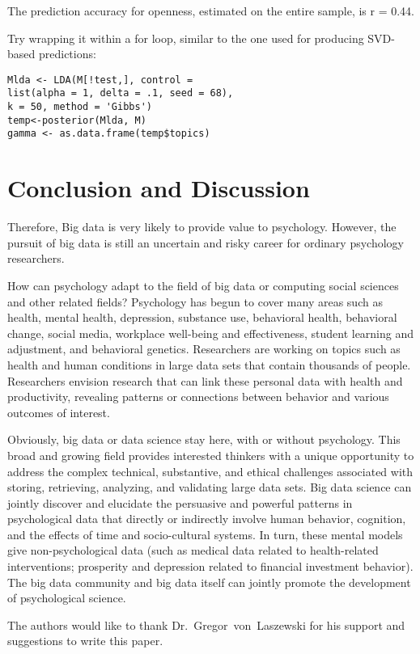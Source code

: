 The prediction accuracy for openness, estimated on the entire
sample, is r = 0.44.

Try wrapping it within a for loop, similar to the one used for 
producing SVD-based predictions:

\begin{verbatim}
Mlda <- LDA(M[!test,], control =
list(alpha = 1, delta = .1, seed = 68),
k = 50, method = 'Gibbs')
temp<-posterior(Mlda, M)
gamma <- as.data.frame(temp$topics)
\end{verbatim}

\section{Conclusion and Discussion}

Therefore, Big data is very likely to provide value to psychology.
 However, the pursuit of big data is still an uncertain and risky 
career for ordinary psychology researchers.

How can psychology adapt to the field of big data or computing 
social sciences and other related fields? Psychology has begun to 
cover many areas such as health, mental health, depression, 
substance use, behavioral health, behavioral change, social media,
 workplace well-being and effectiveness, student learning and 
adjustment, and behavioral genetics. Researchers are working on 
topics such as health and human conditions in large data sets that
 contain thousands of people. Researchers envision research that 
can link these personal data with health and productivity, 
revealing patterns or connections between behavior and various 
outcomes of interest.

Obviously, big data or data science stay here, with or without 
psychology. This broad and growing field provides interested 
thinkers with a unique opportunity to address the complex 
technical, substantive, and ethical challenges associated with 
storing, retrieving, analyzing, and validating large data sets. 
Big data science can jointly discover and elucidate the persuasive
 and powerful patterns in psychological data that directly or 
indirectly involve human behavior, cognition, and the effects of 
time and socio-cultural systems. In turn, these mental models give
 non-psychological data (such as medical data related to 
health-related interventions; prosperity and depression related to
 financial investment behavior). The big data community and big 
data itself can jointly promote the development of psychological 
science.


\begin{acks}

  The authors would like to thank Dr.~Gregor~von~Laszewski for his
  support and suggestions to write this paper.

\end{acks}



 

